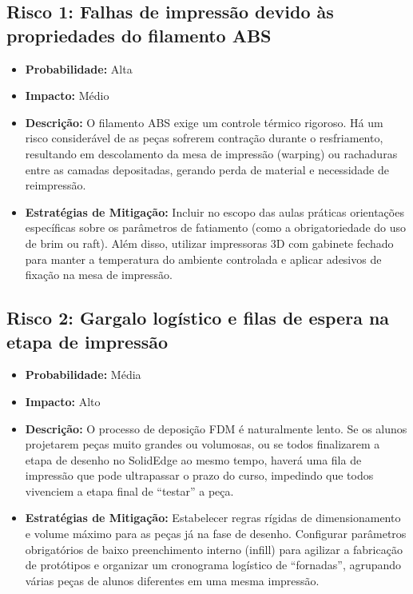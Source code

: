 \documentclass[12pt, a4paper]{article}
\begin{document}
\subsection{Risco 1: Falhas de impressão devido às propriedades do filamento ABS}
\begin{itemize}
    \item \textbf{Probabilidade:} Alta
    \item \textbf{Impacto:} Médio
    \item \textbf{Descrição:} O filamento ABS exige um controle térmico rigoroso. Há um risco considerável de as peças sofrerem contração durante o resfriamento, resultando em descolamento da mesa de impressão (warping) ou rachaduras entre as camadas depositadas, gerando perda de material e necessidade de reimpressão.
    \item \textbf{Estratégias de Mitigação:} Incluir no escopo das aulas práticas orientações específicas sobre os parâmetros de fatiamento (como a obrigatoriedade do uso de brim ou raft). Além disso, utilizar impressoras 3D com gabinete fechado para manter a temperatura do ambiente controlada e aplicar adesivos de fixação na mesa de impressão.
\end{itemize}

\subsection{Risco 2: Gargalo logístico e filas de espera na etapa de impressão}
\begin{itemize}
    \item \textbf{Probabilidade:} Média
    \item \textbf{Impacto:} Alto
    \item \textbf{Descrição:} O processo de deposição FDM é naturalmente lento. Se os alunos projetarem peças muito grandes ou volumosas, ou se todos finalizarem a etapa de desenho no SolidEdge ao mesmo tempo, haverá uma fila de impressão que pode ultrapassar o prazo do curso, impedindo que todos vivenciem a etapa final de ``testar'' a peça.
    \item \textbf{Estratégias de Mitigação:} Estabelecer regras rígidas de dimensionamento e volume máximo para as peças já na fase de desenho. Configurar parâmetros obrigatórios de baixo preenchimento interno (infill) para agilizar a fabricação de protótipos e organizar um cronograma logístico de ``fornadas'', agrupando várias peças de alunos diferentes em uma mesma impressão.
\end{itemize}
\end{document}
